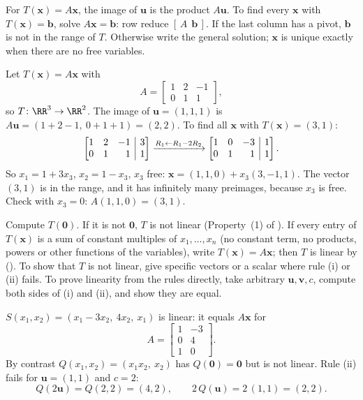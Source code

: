 \documentclass[10pt]{scrartcl}
\makeatletter
\newcommand{\aug}[2]{\left[\begin{array}{@{}#1@{}}#2\end{array}\right]}
\newcommand{\vv}[1]{\mathbf{#1}}
\makeatother
\begin{document}
\begin{steps}
  \ii For $T(\vv x)=A\vv x$, the image of $\vv u$ is the product $A\vv u$.
  \ii To find every $\vv x$ with $T(\vv x)=\vv b$, solve $A\vv x=\vv b$: row reduce $[\,A\ \ \vv b\,]$.
  \ii If the last column has a pivot, $\vv b$ is not in the range of $T$. Otherwise write the general solution; $\vv x$ is unique exactly when there are no free variables.
\end{steps}

\begin{example*}
Let $T(\vv x)=A\vv x$ with
\[
  A=\begin{bmatrix}1&2&-1\\0&1&1\end{bmatrix},
\]
so $T\colon\RR^3\to\RR^2$. The image of $\vv u=(1,1,1)$ is $A\vv u=(1+2-1,\ 0+1+1)=(2,2)$. To find all $\vv x$ with $T(\vv x)=(3,1)$:
\[
  \aug{rrr|r}{1&2&-1&3\\0&1&1&1}\xrightarrow{R_1\leftarrow R_1-2R_2}\aug{rrr|r}{1&0&-3&1\\0&1&1&1}.
\]
So $x_1=1+3x_3$, $x_2=1-x_3$, $x_3$ free: $\vv x=(1,1,0)+x_3(3,-1,1)$. The vector $(3,1)$ is in the range, and it has infinitely many preimages, because $x_3$ is free. Check with $x_3=0$: $A(1,1,0)=(3,1)$.
\end{example*}

\begin{steps}
  \ii Compute $T(\vv 0)$. If it is not $\vv 0$, $T$ is not linear (Property~(1) of ).
  \ii If every entry of $T(\vv x)$ is a sum of constant multiples of $x_1,\dots,x_n$ (no constant term, no products, powers or other functions of the variables), write $T(\vv x)=A\vv x$; then $T$ is linear by ().
  \ii To show that $T$ is not linear, give specific vectors or a scalar where rule (i) or (ii) fails.
  \ii To prove linearity from the rules directly, take arbitrary $\vv u,\vv v,c$, compute both sides of (i) and (ii), and show they are equal.
\end{steps}

\begin{example*}
$S(x_1,x_2)=(x_1-3x_2,\ 4x_2,\ x_1)$ is linear: it equals $A\vv x$ for
\[
  A=\begin{bmatrix}1&-3\\0&4\\1&0\end{bmatrix}.
\]
By contrast $Q(x_1,x_2)=(x_1x_2,\ x_2)$ has $Q(\vv 0)=\vv 0$ but is not linear. Rule (ii) fails for $\vv u=(1,1)$ and $c=2$:
\[
  Q(2\vv u)=Q(2,2)=(4,2),\qquad 2\,Q(\vv u)=2\,(1,1)=(2,2).
\]
\end{example*}
\end{document}
